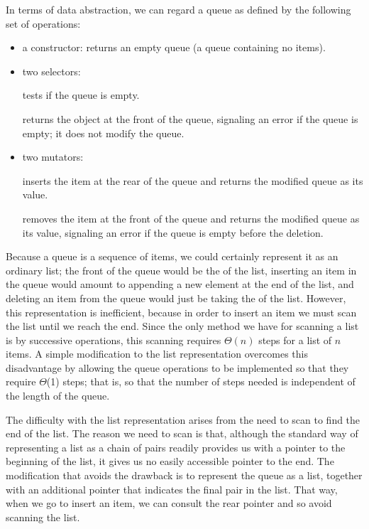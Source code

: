 In terms of data abstraction, we can regard a queue as defined by the following
set of operations:

\begin{itemize}

\item
a constructor:  returns an empty queue (a queue containing
no items).

\item
two selectors:

tests if the queue is empty.

returns the object at the front of the queue, signaling an error if the queue
is empty; it does not modify the queue.

\item
two mutators:

inserts the item at the rear of the queue and returns the modified queue as its
value.

removes the item at the front of the queue and returns the modified queue as
its value, signaling an error if the queue is empty before the deletion.

\end{itemize}

\noindent
Because a queue is a sequence of items, we could certainly represent it as an
ordinary list; the front of the queue would be the  of the list,
inserting an item in the queue would amount to appending a new element at the
end of the list, and deleting an item from the queue would just be taking the
 of the list.  However, this representation is inefficient, because
in order to insert an item we must scan the list until we reach the end.  Since
the only method we have for scanning a list is by successive 
operations, this scanning requires \( \Theta(n) \) steps for a list of \( n \)
items.  A simple modification to the list representation overcomes this
disadvantage by allowing the queue operations to be implemented so that they
require \( \Theta \)(1) steps; that is, so that the number of steps needed is
independent of the length of the queue.

The difficulty with the list representation arises from the need to scan to
find the end of the list.  The reason we need to scan is that, although the
standard way of representing a list as a chain of pairs readily provides us
with a pointer to the beginning of the list, it gives us no easily accessible
pointer to the end.  The modification that avoids the drawback is to represent
the queue as a list, together with an additional pointer that indicates the
final pair in the list.  That way, when we go to insert an item, we can consult
the rear pointer and so avoid scanning the list.

